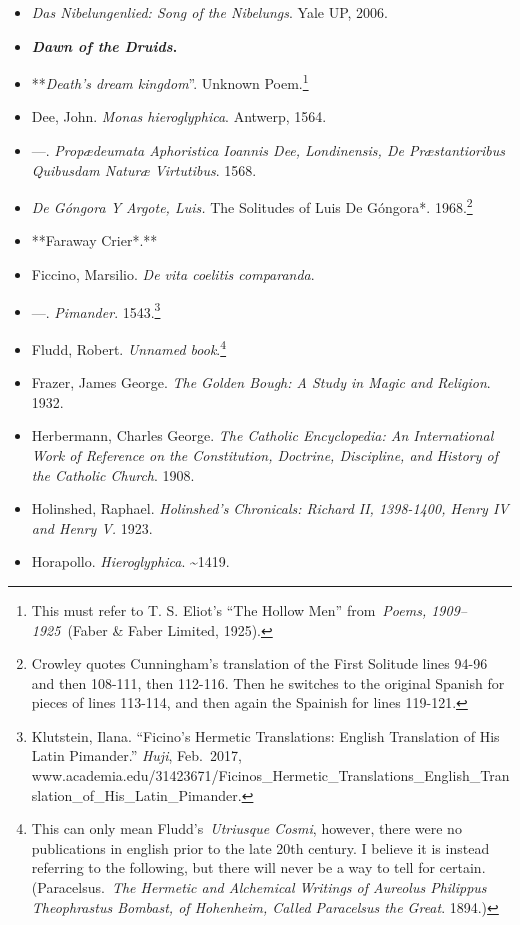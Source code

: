 \documentclass[12pt]{article}
\begin{document}
\begin{itemize}
\item
  \emph{Das Nibelungenlied: Song of the Nibelungs}. Yale UP, 2006.
\item
  \textbf{\emph{Dawn of the Druids}.}
\item
  **\emph{Death's dream kingdom}''. Unknown Poem.\footnote{This must refer to T. S. Eliot's ``The Hollow Men'' from~\emph{Poems, 1909--1925}~(Faber \& Faber Limited, 1925).}
\item
  Dee, John. \emph{Monas hieroglyphica}. Antwerp, 1564.
\item
  ---. \emph{Propædeumata Aphoristica Ioannis Dee, Londinensis, De Præstantioribus Quibusdam Naturæ Virtutibus}. 1568.
\item
  \emph{De Góngora Y Argote, Luis. }The Solitudes of Luis De Góngora*. 1968.\footnote{Crowley quotes Cunningham's translation of the First Solitude lines 94-96 and then 108-111, then 112-116. Then he switches to the original Spanish for pieces of lines 113-114, and then again the Spainish for lines 119-121.}
\item
  **Faraway Crier*.**
\item
  Ficcino, Marsilio. \emph{De vita coelitis comparanda}.
\item
  ---. \emph{Pimander}. 1543.\footnote{Klutstein, Ilana. ``Ficino's Hermetic Translations: English Translation of His Latin Pimander.'' \emph{Huji}, Feb.~2017, www.academia.edu/31423671/Ficinos\_Hermetic\_Translations\_English\_Translation\_of\_His\_Latin\_Pimander.}
\item
  Fludd, Robert. \emph{Unnamed book}.\footnote{This can only mean Fludd's~\emph{Utriusque Cosmi}, however, there were no publications in english prior to the late 20th century. I believe it is instead referring to the following, but there will never be a way to tell for certain. (Paracelsus.~\emph{The Hermetic and Alchemical Writings of Aureolus Philippus Theophrastus Bombast, of Hohenheim, Called Paracelsus the Great}. 1894.)}
\item
  Frazer, James George. \emph{The Golden Bough: A Study in Magic and Religion}. 1932.
\item
  Herbermann, Charles George. \emph{The Catholic Encyclopedia: An International Work of Reference on the Constitution, Doctrine, Discipline, and History of the Catholic Church}. 1908.
\item
  Holinshed, Raphael. \emph{Holinshed's Chronicals: Richard II, 1398-1400, Henry IV and Henry V.} 1923.
\item
  Horapollo. \emph{Hieroglyphica}. \textasciitilde1419.

\end{itemize}
\end{document}
